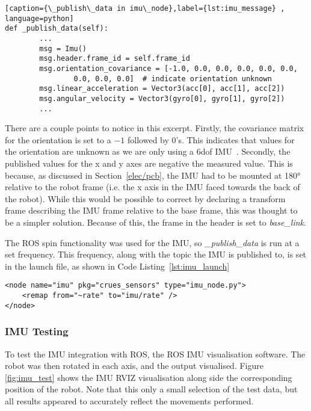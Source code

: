 \begin{lstlisting}[caption={\_publish\_data in imu\_node},label={lst:imu_message} , language=python]
def _publish_data(self):
        ...
        msg = Imu()
        msg.header.frame_id = self.frame_id
        msg.orientation_covariance = [-1.0, 0.0, 0.0, 0.0, 0.0, 0.0,
                0.0, 0.0, 0.0]  # indicate orientation unknown
        msg.linear_acceleration = Vector3(acc[0], acc[1], acc[2])
        msg.angular_velocity = Vector3(gyro[0], gyro[1], gyro[2])
        ...
\end{lstlisting}
There are a couple points to notice in this excerpt. Firstly, the 
covariance matrix for the orientation is set to a $-1$ followed by 0's. 
This indicates that values for the orientation are unknown as we are only 
using a 6dof IMU~\cite{ROSIMUMsg}. Secondly, the published values for the 
x and y axes are negative the measured value. This is because, as 
discussed in Section~\ref{elec/pcb}, the IMU had to be mounted at 
\ang{180} relative to the robot frame (i.e. the x axis in the IMU faced 
towards the back of the robot). While this would be possible to correct by 
declaring a transform frame describing the IMU frame relative to the base 
frame, this was thought to be a simpler solution. Because of this, the 
frame in the header is set to \textit{base\_link}.

The ROS spin functionality was used for the IMU, so
\textit{\_publish\_data} is run at a set
frequency. This frequency, along with the topic the
IMU is published to, is set in the launch file, as
shown in Code Listing~\ref{lst:imu_launch}

\begin{lstlisting}[caption={\texttt{\_publish\_data} in \texttt{imu\_node}}, label={lst:imu_message}, style=xml]
<node name="imu" pkg="crues_sensors" type="imu_node.py">
    <remap from="~rate" to="imu/rate" />
</node>
\end{lstlisting}

\subsubsection{IMU Testing}\label{soft/odometry/imu/test}

To test the IMU integration with ROS, the ROS IMU visualisation software. 
The robot was then rotated in each axis, and the output visualised.  
Figure \ref{fig:imu_test} shows the IMU RVIZ visualisation along side the 
corresponding position of the robot. Note that this only a small selection 
of the test data, but all results appeared to accurately reflect the 
movements performed.

